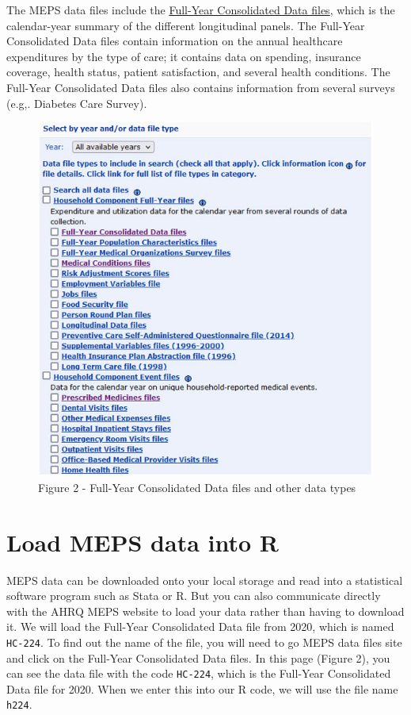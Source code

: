 \documentclass[
]{book}
\begin{document}
The MEPS data files include the \href{https://www.meps.ahrq.gov/mepsweb/data_stats/download_data_files_detail.jsp?cboPufNumber=HC-224}{Full-Year Consolidated Data files}, which is the calendar-year summary of the different longitudinal panels. The Full-Year Consolidated Data files contain information on the annual healthcare expenditures by the type of care; it contains data on spending, insurance coverage, health status, patient satisfaction, and several health conditions. The Full-Year Consolidated Data files also contains information from several surveys (e.g,. Diabetes Care Survey).

\begin{figure}
\includegraphics[width=1\linewidth]{Figure 2} \caption{Figure 2 - Full-Year Consolidated Data files and other data types}\label{fig:unnamed-chunk-3}
\end{figure}

\hypertarget{load-meps-data-into-r}{%
\section{Load MEPS data into R}\label{load-meps-data-into-r}}

MEPS data can be downloaded onto your local storage and read into a statistical software program such as Stata or R. But you can also communicate directly with the AHRQ MEPS website to load your data rather than having to download it. We will load the Full-Year Consolidated Data file from 2020, which is named \texttt{HC-224}. To find out the name of the file, you will need to go MEPS data files site and click on the Full-Year Consolidated Data files. In this page (Figure 2), you can see the data file with the code \texttt{HC-224}, which is the Full-Year Consolidated Data file for 2020. When we enter this into our R code, we will use the file name \texttt{h224}.
\end{document}
